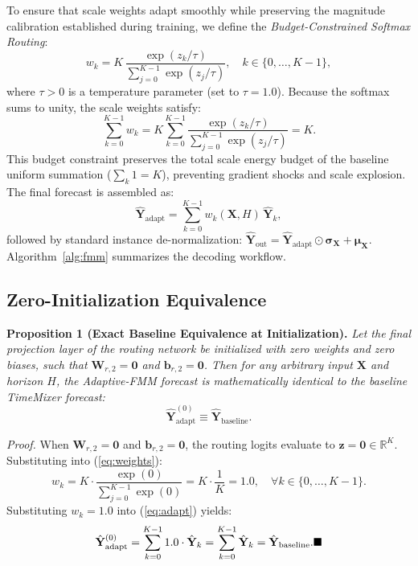 \documentclass[journal]{IEEEtran}
\begin{document}
To ensure that scale weights adapt smoothly while preserving the magnitude calibration established during training, we define the \textit{Budget-Constrained Softmax Routing}:
\begin{equation}
w_k = K\,\frac{\exp(z_k/\tau)}{\sum_{j=0}^{K-1}\exp(z_j/\tau)}, \quad k \in \{0, \dots, K-1\},
\label{eq:weights}
\end{equation}
where $\tau>0$ is a temperature parameter (set to $\tau=1.0$). Because the softmax sums to unity, the scale weights satisfy:
\begin{equation}
\sum_{k=0}^{K-1} w_k = K \sum_{k=0}^{K-1} \frac{\exp(z_k/\tau)}{\sum_{j=0}^{K-1}\exp(z_j/\tau)} = K.
\end{equation}
This budget constraint preserves the total scale energy budget of the baseline uniform summation ($\sum_k 1 = K$), preventing gradient shocks and scale explosion. The final forecast is assembled as:
\begin{equation}
\hat{\mathbf{Y}}_{\text{adapt}}=\sum_{k=0}^{K-1} w_k(\mathbf{X},H)\,\hat{\mathbf{Y}}_k ,
\label{eq:adapt}
\end{equation}
followed by standard instance de-normalization: $\hat{\mathbf{Y}}_{\text{out}} = \hat{\mathbf{Y}}_{\text{adapt}}\odot\boldsymbol{\sigma}_{\mathbf{X}}+\boldsymbol{\mu}_{\mathbf{X}}$. Algorithm~\ref{alg:fmm} summarizes the decoding workflow.

\subsection{Zero-Initialization Equivalence}
\textbf{Proposition 1 (Exact Baseline Equivalence at Initialization).} \textit{Let the final projection layer of the routing network be initialized with zero weights and zero biases, such that $\mathbf{W}_{r,2}=\mathbf{0}$ and $\mathbf{b}_{r,2}=\mathbf{0}$. Then for any arbitrary input $\mathbf{X}$ and horizon $H$, the Adaptive-FMM forecast is mathematically identical to the baseline TimeMixer forecast:}
\begin{equation}
\hat{\mathbf{Y}}_{\text{adapt}}^{(0)} \equiv \hat{\mathbf{Y}}_{\text{baseline}}.
\end{equation}

\textit{Proof.} When $\mathbf{W}_{r,2}=\mathbf{0}$ and $\mathbf{b}_{r,2}=\mathbf{0}$, the routing logits evaluate to $\mathbf{z}=\mathbf{0} \in \mathbb{R}^K$. Substituting into (\ref{eq:weights}):
\begin{equation}
w_k = K\cdot\frac{\exp(0)}{\sum_{j=0}^{K-1}\exp(0)} = K\cdot\frac{1}{K} = 1.0, \quad \forall k \in \{0, \dots, K-1\}.
\end{equation}
Substituting $w_k = 1.0$ into (\ref{eq:adapt}) yields:
\begin{equation}
\hat{\mathbf{Y}}_{\text{adapt}}^{(0)} = \sum_{k=0}^{K-1} 1.0 \cdot \hat{\mathbf{Y}}_k = \sum_{k=0}^{K-1} \hat{\mathbf{Y}}_k = \hat{\mathbf{Y}}_{\text{baseline}}. \hfill\blacksquare
\end{equation}
\end{document}
